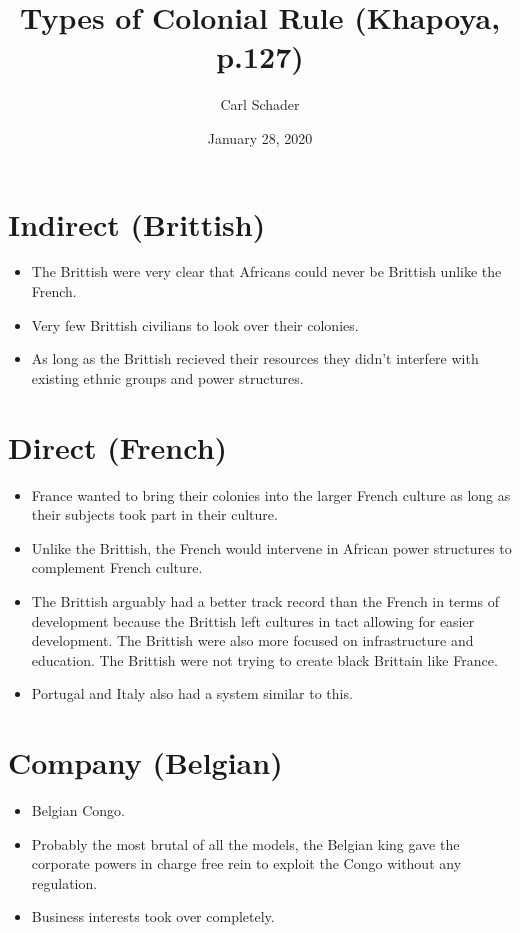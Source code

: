 \documentclass{article}
\title{Types of Colonial Rule (Khapoya, p.127)}
\author{Carl Schader}
\date{January 28, 2020}
\begin{document}
\maketitle

\section{Indirect (Brittish)}
	\begin{itemize}
	\item The Brittish were very clear that Africans could never be Brittish unlike the French.
	\item Very few Brittish civilians to look over their colonies.
	\item As long as the Brittish recieved their resources they didn't interfere with existing ethnic groups and power structures.
	\end{itemize}
	
\section{Direct (French)}
	\begin{itemize}
	\item France wanted to bring their colonies into the larger French culture as long as their subjects took part in their culture.
	\item Unlike the Brittish, the French would intervene in African power structures to complement French culture.
	\item The Brittish arguably had a better track record than the French in terms of development because the Brittish left cultures in tact allowing for easier development. The Brittish were also more focused on infrastructure and education. The Brittish were not trying to create black Brittain like France.
	\item Portugal and Italy also had a system similar to this.
	\end{itemize}
	
\section{Company (Belgian)}
	\begin{itemize}
	\item Belgian Congo.
	\item Probably the most brutal of all the models, the Belgian king gave the corporate powers in charge free rein to exploit the Congo without any regulation.
	\item Business interests took over completely.
	\end{itemize}
\end{document}
